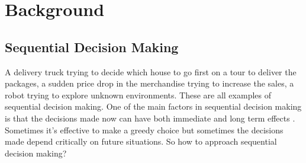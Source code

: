 \documentclass[12pt]{report}
\begin{document}
\chapter{Background} %

\label{background} %


\section{Sequential Decision Making}
A delivery truck trying to decide which house to go first on a tour to deliver the packages, a sudden price drop in the merchandise trying to increase the sales, a robot trying to explore unknown environments. These are all examples of sequential decision making. One of the main factors in sequential decision making is that the decisions made now can have both immediate and long term effects \cite{littman1996algorithms}. Sometimes it's effective to make a greedy choice but sometimes the decisions made depend critically on future situations. So how to approach sequential decision making?
\end{document}
